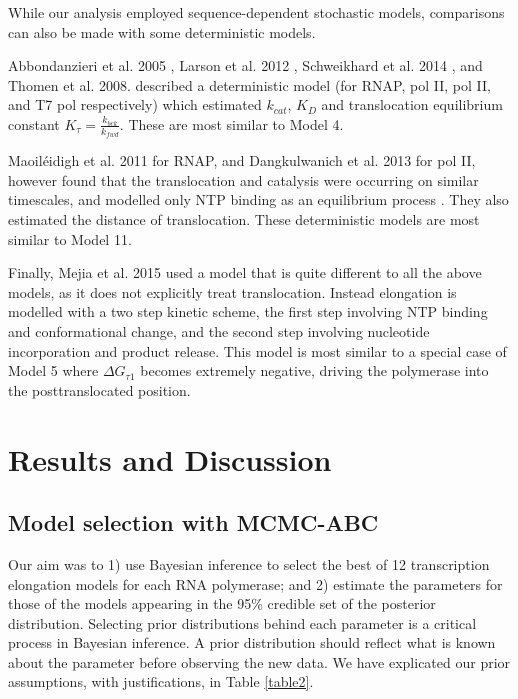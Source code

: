 \documentclass[10pt,letterpaper]{article}
\begin{document}
While our analysis employed sequence-dependent stochastic models, comparisons can also be made with some deterministic models.


Abbondanzieri et al. 2005 \cite{abbondanzieri2005direct}, Larson et al. 2012 \cite{larson2012trigger} , Schweikhard et al. 2014 \cite{schweikhard2014transcription}, and Thomen et al. 2008. \cite{thomen2008t7, thomen2005unravelling}  described a deterministic model (for RNAP, pol II, pol II, and T7 pol respectively) which estimated $k_{cat}$, $K_D$ and translocation equilibrium constant $K_\tau = \frac{k_{bck}}{k_{fwd}}$. These are most similar to Model 4.




Maoil{\'e}idigh et al. 2011 for RNAP, and Dangkulwanich et al. 2013 for pol II, however found that the translocation and catalysis were occurring on similar timescales, and modelled only NTP binding as an equilibrium process  \cite{maoileidigh2011unified, Dangkulwanich2013complete}. They also estimated the distance of translocation. These deterministic models are most similar to Model 11.




Finally, Mejia et al. 2015 \cite{mejia2015trigger} used a model that is quite different to all the above models, as it does not explicitly treat translocation. Instead elongation is modelled with a two step kinetic scheme, the first step involving NTP binding and conformational change, and the second step involving nucleotide incorporation and product release. This model is most similar to a special case of Model 5 where $\Delta G_{\tau 1}$ becomes extremely negative, driving the polymerase into the posttranslocated position.  






\section*{Results and Discussion}





\subsection*{Model selection with MCMC-ABC}


Our aim was to 1) use Bayesian inference to select the best of 12 transcription elongation models for each RNA polymerase; and 2) estimate the parameters for those of the models appearing in the 95\% credible set of the posterior distribution. Selecting prior distributions behind each parameter is a  critical process in Bayesian inference. A prior distribution should reflect what is known about the parameter before observing the new data. We have explicated our prior assumptions, with justifications, in Table \ref{table2}. \par
\end{document}
